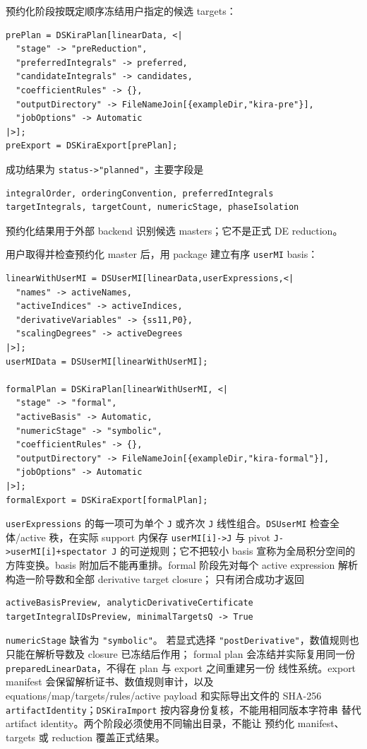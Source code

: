 ﻿\documentclass[a4paper,11pt]{article}
\begin{document}
预约化阶段按既定顺序冻结用户指定的候选 targets：
\begin{verbatim}
prePlan = DSKiraPlan[linearData, <|
  "stage" -> "preReduction",
  "preferredIntegrals" -> preferred,
  "candidateIntegrals" -> candidates,
  "coefficientRules" -> {},
  "outputDirectory" -> FileNameJoin[{exampleDir,"kira-pre"}],
  "jobOptions" -> Automatic
|>];
preExport = DSKiraExport[prePlan];
\end{verbatim}
成功结果为 \texttt{status->"planned"}，主要字段是
\begin{verbatim}
integralOrder, orderingConvention, preferredIntegrals
targetIntegrals, targetCount, numericStage, phaseIsolation
\end{verbatim}
预约化结果用于外部 backend 识别候选 masters；它不是正式 DE reduction。

用户取得并检查预约化 master 后，用 package 建立有序 \texttt{userMI} basis：
\begin{verbatim}
linearWithUserMI = DSUserMI[linearData,userExpressions,<|
  "names" -> activeNames,
  "activeIndices" -> activeIndices,
  "derivativeVariables" -> {ss11,P0},
  "scalingDegrees" -> activeDegrees
|>];
userMIData = DSUserMI[linearWithUserMI];

formalPlan = DSKiraPlan[linearWithUserMI, <|
  "stage" -> "formal",
  "activeBasis" -> Automatic,
  "numericStage" -> "symbolic",
  "coefficientRules" -> {},
  "outputDirectory" -> FileNameJoin[{exampleDir,"kira-formal"}],
  "jobOptions" -> Automatic
|>];
formalExport = DSKiraExport[formalPlan];
\end{verbatim}
\texttt{userExpressions} 的每一项可为单个 \texttt{J} 或齐次 \texttt{J} 线性组合。\texttt{DSUserMI} 检查全体/active 秩，在实际 support 内保存 \texttt{userMI[i]->J} 与 pivot \texttt{J->userMI[i]+spectator J} 的可逆规则；它不把较小 basis 宣称为全局积分空间的方阵变换。basis 附加后不能再重排。formal 阶段先对每个 active expression 解析构造一阶导数和全部 derivative target closure；
只有闭合成功才返回
\begin{verbatim}
activeBasisPreview, analyticDerivativeCertificate
targetIntegralIDsPreview, minimalTargetsQ -> True
\end{verbatim}
\texttt{numericStage} 缺省为 \texttt{"symbolic"}。
若显式选择 \texttt{"postDerivative"}，数值规则也只能在解析导数及 closure 已冻结后作用；
formal plan 会冻结并实际复用同一份 \texttt{preparedLinearData}，不得在 plan 与 export 之间重建另一份
线性系统。export manifest 会保留解析证书、数值规则审计，以及 equations/map/targets/rules/active
payload 和实际导出文件的 SHA-256 \texttt{artifactIdentity}；\texttt{DSKiraImport} 按内容身份复核，不能用相同版本字符串
替代 artifact identity。两个阶段必须使用不同输出目录，不能让
预约化 manifest、targets 或 reduction 覆盖正式结果。
\end{document}
